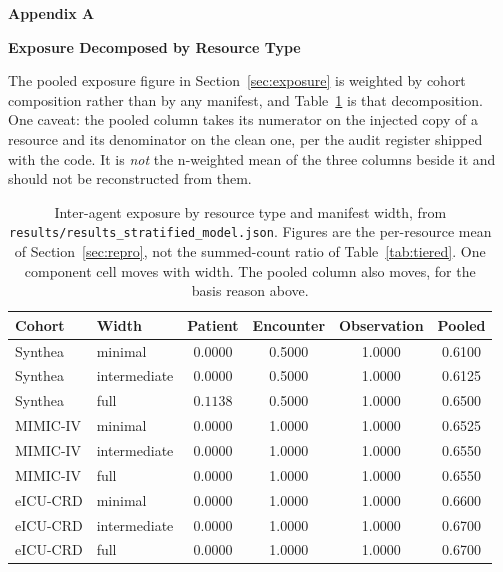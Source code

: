 \FloatBarrier
\newpage
{}
{\centering\normalfont\bfseries\large Appendix A\par}
{\centering\normalfont\bfseries\large Exposure Decomposed by Resource Type\par}
\nopagebreak
\setcounter{table}{0}
\renewcommand{\thetable}{A\arabic{table}}

The pooled exposure figure in Section~\ref{sec:exposure} is weighted by cohort composition rather
than by any manifest, and Table~\ref{tab:exposure} is that decomposition. One caveat: the pooled
column takes its numerator on the injected copy of a resource and its denominator on the clean
one, per the audit register shipped with the code. It is \emph{not} the n-weighted mean of the
three columns beside it and should not be reconstructed from them.

\begin{table}[!ht]
\centering
\caption{Inter-agent exposure by resource type and manifest width, from
\texttt{results/results\_stratified\_model.json}. Figures are the per-resource mean of
Section~\ref{sec:repro}, not the summed-count ratio of Table~\ref{tab:tiered}. One component cell
moves with width. The pooled column also moves, for the basis reason above.}
\label{tab:exposure}
\begin{tabular}{llcccc}
\toprule
Cohort & Width & Patient & Encounter & Observation & Pooled \\
\midrule
Synthea       & minimal      & 0.0000 & 0.5000 & 1.0000 & 0.6100 \\
Synthea       & intermediate & 0.0000 & 0.5000 & 1.0000 & 0.6125 \\
Synthea       & full         & $\mathbf{0.1138}$ & 0.5000 & 1.0000 & 0.6500 \\
MIMIC-IV      & minimal      & 0.0000 & 1.0000 & 1.0000 & 0.6525 \\
MIMIC-IV      & intermediate & 0.0000 & 1.0000 & 1.0000 & 0.6550 \\
MIMIC-IV      & full         & 0.0000 & 1.0000 & 1.0000 & 0.6550 \\
eICU-CRD      & minimal      & 0.0000 & 1.0000 & 1.0000 & 0.6600 \\
eICU-CRD      & intermediate & 0.0000 & 1.0000 & 1.0000 & 0.6700 \\
eICU-CRD      & full         & 0.0000 & 1.0000 & 1.0000 & 0.6700 \\
\bottomrule
\end{tabular}
\end{table}

\FloatBarrier
